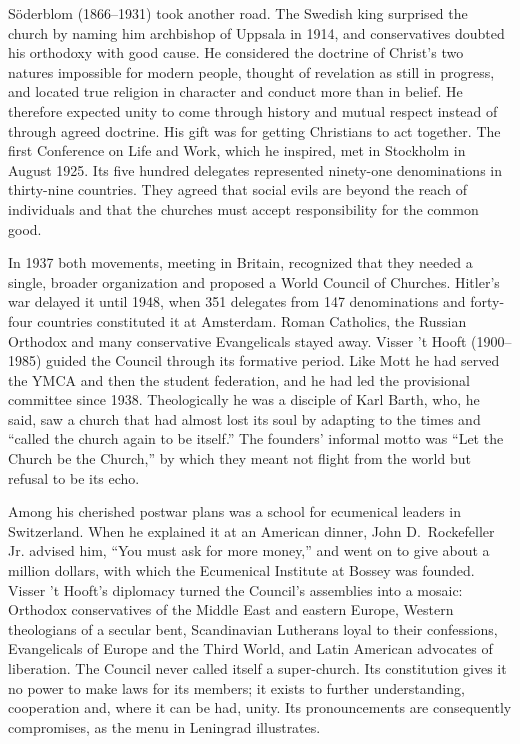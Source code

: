S\"oderblom (1866--1931) took another road. The Swedish king surprised the church by naming him
archbishop of Uppsala in 1914, and conservatives doubted his orthodoxy with good cause. He considered
the doctrine of Christ's two natures impossible for modern people, thought of revelation as still in
progress, and located true religion in character and conduct more than in belief. He therefore
expected unity to come through history and mutual respect instead of through agreed doctrine. His
gift was for getting Christians to act together. The first Conference on Life and Work, which he
inspired, met in Stockholm in August 1925. Its five hundred delegates represented ninety-one denominations in thirty-nine countries. They agreed that social evils are beyond the reach of individuals and that the
churches must accept responsibility for the common good.

In 1937 both movements, meeting in Britain, recognized that they needed a single, broader
organization and proposed a World Council of Churches. Hitler's war delayed it until 1948, when 351
delegates from 147 denominations and forty-four countries constituted it at Amsterdam. Roman
Catholics, the Russian Orthodox and many conservative Evangelicals stayed away. Visser 't Hooft
(1900--1985) guided the Council through its formative period. Like Mott he had served the YMCA and
then the student federation, and he had led the provisional committee since 1938. Theologically he
was a disciple of Karl Barth, who, he said, saw a church that had almost lost its soul by adapting to
the times and ``called the church again to be itself.'' The founders' informal motto was ``Let the
Church be the Church,'' by which they meant not flight from the world but refusal to be its echo.

Among his cherished postwar plans was a school for ecumenical leaders in Switzerland. When he
explained it at an American dinner, John D.~Rockefeller Jr. advised him, ``You must ask for more
money,'' and went on to give about a million dollars, with which the Ecumenical Institute at Bossey
was founded. Visser 't Hooft's diplomacy turned the Council's assemblies into a mosaic: Orthodox conservatives of the Middle East and eastern Europe, Western theologians of a secular bent, Scandinavian Lutherans loyal to their confessions, Evangelicals of Europe and the Third World, and Latin American advocates of liberation. The Council never called itself a super-church. Its constitution gives it no
power to make laws for its members; it exists to further understanding, cooperation and, where it can
be had, unity. Its pronouncements are consequently compromises, as the menu in Leningrad illustrates.

